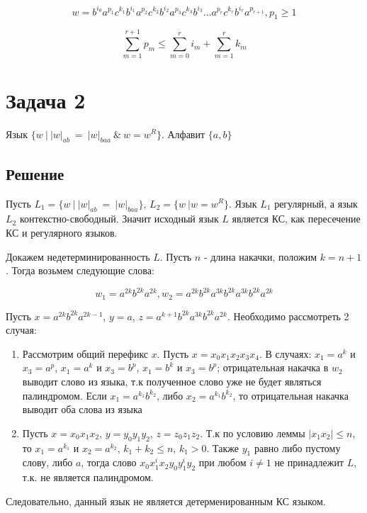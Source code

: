 \documentclass[a4paper, 14pt]{article}
\begin{document}
$$w = b^{i_0}a^{p_1}c^{k_1}b^{i_1}a^{p_2}c^{k_2}b^{i_2}a^{p_3}c^{k_3}b^{i_3}\ldots a^{p_r}c^{k_r}b^{i_r}a^{p_{r + 1}}, p_1 \geq 1 $$

\[ \sum_{m=1}^{r + 1}{p_m} \leq \sum_{m=0}^{r}{i_m} +  \sum_{m=1}^{r}{k_m}\]

\newpage 
\section{Задача 2}

Язык $\Big\{ w \ \Big| \ |w|_{ab} \ = \ |w|_{baa} \ \& \ w = w^{R} \Big\}$. Алфавит $\{a, b\}$


\subsection{Решение}

Пусть $L_1 = \{w \ \Big| \ |w|_{ab} \ = \ |w|_{baa} \}$, $L_2 = \{w \ \Big| w = w^{R}\}$. Язык $L_1$ регулярный, а язык $L_2$ контекстно-свободный. Значит исходный язык $L$ является КС, как пересечение КС и регулярного языков.

Докажем недетерминированность $L$. Пусть $n$ - длина накачки, положим $k = n + 1$. Тогда возьмем следующие слова: 

$$w_1 = a^{2k}b^{2k}a^{2k}, w_2 = a^{2k}b^{2k}a^{3k}b^{2k}a^{3k}b^{2k}a^{2k}$$

Пусть $x = a^{2k}b^{2k}a^{2k - 1}$, $y = a$, $z = a^{k + 1}b^{2k}a^{3k}b^{2k}a^{2k}$. Необходимо рассмотреть 2 случая:

\begin{enumerate}
  \item{Рассмотрим общий перефикс $x$. Пусть $x = x_0 x_1 x_2 x_3 x_4$. В случаях: $x_1 = a^k$ и $x_3 = a^p$, $x_1 = a^k$ и $x_3 = b^p$, $x_1 = b^k$ и $x_3 = b^p$}; отрицательная накачка в $w_2$ выводит слово из языка, т.к полученное слово уже не будет являться палиндромом. Если $x_1 = a^{k_1} b^{k_2}$, либо $x_2 = a^{k_1} b^{k_2}$, то отрицательная накачка выводит оба слова из языка
  \item{Пусть $x = x_0 x_1 x_2$, $y = y_0 y_1 y_2$, $z = z_0 z_1 z_2$}. Т.к по условию леммы $|x_1 x_2| \leq n$, то $x_1 = a^{k_1}$ и $x_2 = a^{k_2}$, $k_1 + k_2 \leq n$, $k_1 > 0$. Также $y_1$ равно либо пустому слову, либо $a$, тогда слово $x_0 x_1^{i} x_2 y_0 y_1^{i} y_2$ при любом $i \neq 1$ не принадлежит $L$, т.к. не является палиндромом.
\end{enumerate}

Следовательно, данный язык не является детерменированным КС языком.
\end{document}
